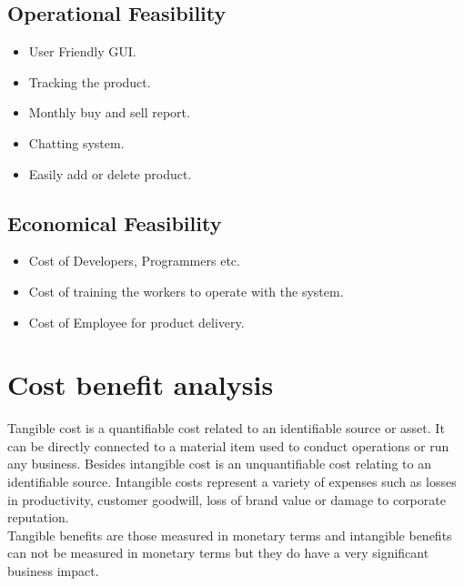   \subsection{Operational Feasibility}
  \begin{itemize}
  \item User Friendly GUI.
  \item Tracking the product.
  \item Monthly buy and sell report.
  \item Chatting system.
  \newpage
  \item Easily add or delete product.
  \end{itemize}
 
   \subsection{ Economical Feasibility}
  \begin{itemize}
  \item Cost of Developers, Programmers etc.
  \item Cost of training the workers to operate with the system.
  \item Cost of Employee for product delivery.
  \end{itemize}
  
   \section{Cost benefit analysis}

 Tangible cost is a quantifiable cost related to an identifiable source or asset. It can be directly connected to a material item used to conduct operations or run any business. Besides  intangible cost is an unquantifiable cost relating to an identifiable source. Intangible costs represent a variety of expenses such as losses in productivity, customer goodwill, loss of brand value or damage to corporate reputation.\\
 \break
 Tangible benefits are those measured in monetary terms and intangible benefits can not be measured in monetary terms but they do have a very significant business impact. 
  
